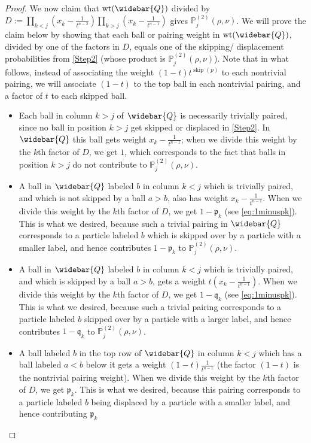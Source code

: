 \documentclass[12pt]{amsart}
\theoremstyle{definition}
\DeclareMathOperator{\wt}{wt}
\DeclareMathOperator{\skipped}{skip}
\newcommand{\Qbar}{\widebar{Q}}
\newcommand{\PPtwo}[1]{\mathbb P^{(2)}_{#1}}
\newcommand{\mfp}{\mathfrak p}
\newcommand{\mfq}{\mathfrak q}
\def\LW#1{(\textcolor{teal}{LW:#1})}
\begin{document}
\begin{proof}
We now claim that $\wt(\Qbar)$ divided by 
$D:=\prod_{k<j}\left(x_k-\frac{1}{t^{n-2}}\right)\prod_{k>j}\left(x_k-\frac{1}{t^{n-1}}\right)$ gives $\PPtwo{j}(\rho,\nu)$.  We will prove the claim below by showing that each 
ball or pairing weight in $\wt(\Qbar)$,
divided by one of the factors in $D$, equals one of the skipping/ displacement
probabilities from \cref{Step2}
(whose product is $\PPtwo{j}(\rho,\nu)$).  Note that in what follows,
instead of associating the weight 
$(1-t)t^{\skipped(p)}$ to each nontrivial pairing,
we will associate $(1-t)$ to the top ball in each nontrivial pairing,
and a factor of $t$ to each skipped ball.
\begin{itemize}
    \item Each ball in column $k>j$ of $\Qbar$ is necessarily trivially paired, since no ball in position $k>j$ get skipped or displaced in \ref{Step2}.
      In $\Qbar$ this ball gets  weight $x_k-\frac{1}{t^{n-1}}$; when we divide this weight by the $k$th factor of $D$, we get $1$, which corresponds to the fact that balls in position $k>j$ do not contribute to $\PPtwo{j}(\rho,\nu)$.
        \item A ball in $\Qbar$ labeled $b$ in column $k<j$ which is trivially paired, and which is not skipped by a ball $a>b$, also has weight $x_k-\frac{1}{t^{n-1}}$. When we divide this weight by the $k$th factor of $D$, we get $1-\mfp_k$ (see \eqref{eq:1minuspk}).  This is what we desired, because such a trivial pairing in $\Qbar$ corresponds to a particle labeled $b$ which is skipped over by a particle with a smaller label, and hence contributes $1-\mfp_k$
        to $\PPtwo{j}(\rho,\nu)$.
    \item A ball in $\Qbar$ labeled $b$ in column $k<j$ which is trivially paired, and which is skipped by a ball $a>b$, gets a weight $t(x_k-\frac{1}{t^{n-1}})$.  When we divide this weight by the 
    $k$th factor of $D$, we get $1-\mfq_k$
    (see \eqref{eq:1minuspk}).
    This is what we desired, because such a trivial pairing corresponds to a particle labeled $b$ skipped over by a particle with a larger label, and hence contributes $1-\mfq_k$ to $\PPtwo{j}(\rho,\nu)$.
    \item A ball labeled $b$ in the top row of $\Qbar$ in column $k<j$ which has a ball labeled $a<b$ below it gets a weight $(1-t)\frac{1}{t^{n-1}}$
    (the factor $(1-t)$ is the nontrivial pairing weight). When we divide this weight by the $k$th factor of $D$, we get $\mfp_k$.  This is what we desired, because this pairing corresponds to a particle labeled $b$ being displaced by a particle with a smaller label, and hence contributing $\mfp_k$ 

\end{itemize}
\end{proof}
\end{document}
